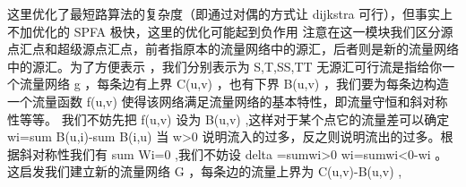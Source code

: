 {}这里优化了最短路算法的复杂度（即通过对偶的方式让\markdownRendererDollarSign{} dijkstra \markdownRendererDollarSign{}可行），但事实上不加优化的\markdownRendererDollarSign{} SPFA \markdownRendererDollarSign{}极快，这里的优化可能起到负作用\markdownRendererInterblockSeparator
{}\markdownRendererSectionBegin
{}\markdownRendererInterblockSeparator
{}\markdownRendererInterblockSeparator
{}
\markdownRendererSectionEnd \markdownRendererSectionBegin
{}\markdownRendererInterblockSeparator
{}\markdownRendererInterblockSeparator
{}
\markdownRendererSectionEnd 
\markdownRendererSectionEnd \markdownRendererSectionBegin
{}\markdownRendererInterblockSeparator
{}注意在这一模块我们区分源点汇点和超级源点汇点，前者指原本的流量网络中的源汇，后者则是新的流量网络中的源汇。为了方便表示 ，我们分别表示为\markdownRendererDollarSign{} S,T,SS,TT\markdownRendererSoftLineBreak
{}\markdownRendererDollarSign{}\markdownRendererInterblockSeparator
{}\markdownRendererSectionBegin
{}\markdownRendererInterblockSeparator
{}无源汇可行流是指给你一个流量网络\markdownRendererDollarSign{} g \markdownRendererDollarSign{}，每条边有上界\markdownRendererDollarSign{} C(u,v) \markdownRendererDollarSign{}，也有下界\markdownRendererDollarSign{} B(u,v) \markdownRendererDollarSign{}，我们要为每条边构造一个流量函数\markdownRendererDollarSign{} f(u,v) \markdownRendererDollarSign{}使得该网络满足流量网络的基本特性，即流量守恒和斜对称性等等。\markdownRendererParagraphSeparator
{}我们不妨先把\markdownRendererDollarSign{} f(u,v) \markdownRendererDollarSign{}设为\markdownRendererDollarSign{} B(u,v) \markdownRendererDollarSign{},这样对于某个点它的流量差可以确定\markdownRendererDollarSign{} w\markdownRendererUnderscore{}i=\markdownRendererBackslash{}sum B(u,i)-\markdownRendererBackslash{}sum B(i,u) \markdownRendererDollarSign{}\markdownRendererParagraphSeparator
{}当\markdownRendererDollarSign{} w>0 \markdownRendererDollarSign{}说明流入的过多，反之则说明流出的过多。根据斜对称性我们有\markdownRendererDollarSign{} \markdownRendererBackslash{}sum W\markdownRendererUnderscore{}i=0 \markdownRendererDollarSign{},我们不妨设\markdownRendererDollarSign{} \markdownRendererBackslash{}delta =\markdownRendererBackslash{}sum\markdownRendererUnderscore{}\markdownRendererLeftBrace{}wi>0\markdownRendererRightBrace{} wi=\markdownRendererBackslash{}sum\markdownRendererUnderscore{}\markdownRendererLeftBrace{}wi<0\markdownRendererRightBrace{}-wi \markdownRendererDollarSign{}。这启发我们建立新的流量网络\markdownRendererDollarSign{} G \markdownRendererDollarSign{}，每条边的流量上界为\markdownRendererDollarSign{} C(u,v)-B(u,v) \markdownRendererDollarSign{},\markdownRendererParagraphSeparator
